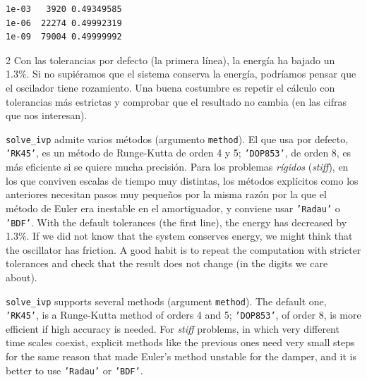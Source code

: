 \begin{verbatim}
1e-03   3920 0.49349585
1e-06  22274 0.49992319
1e-09  79004 0.49999992
\end{verbatim}
\begin{paracol}{2}
Con las tolerancias por defecto (la primera línea), la energía ha bajado un 1.3\%. Si no supiéramos que el sistema conserva la energía, podríamos pensar que el oscilador tiene rozamiento. Una buena costumbre es repetir el cálculo con tolerancias más estrictas y comprobar que el resultado no cambia (en las cifras que nos interesan).

\texttt{solve_ivp} admite varios métodos (argumento \texttt{method}). El que usa por defecto, \texttt{'RK45'}, es un método de Runge-Kutta de orden 4 y 5; \texttt{'DOP853'}, de orden 8, es más eficiente si se quiere mucha precisión. Para los problemas \emph{rígidos} (\emph{stiff}), en los que conviven escalas de tiempo muy distintas, los métodos explícitos como los anteriores necesitan pasos muy pequeños por la misma razón por la que el método de Euler era inestable en el amortiguador, y conviene usar \texttt{'Radau'} o \texttt{'BDF'}.
\switchcolumn
With the default tolerances (the first line), the energy has decreased by 1.3\%. If we did not know that the system conserves energy, we might think that the oscillator has friction. A good habit is to repeat the computation with stricter tolerances and check that the result does not change (in the digits we care about).

\texttt{solve_ivp} supports several methods (argument \texttt{method}). The default one, \texttt{'RK45'}, is a Runge-Kutta method of orders 4 and 5; \texttt{'DOP853'}, of order 8, is more efficient if high accuracy is needed. For \emph{stiff} problems, in which very different time scales coexist, explicit methods like the previous ones need very small steps for the same reason that made Euler's method unstable for the damper, and it is better to use \texttt{'Radau'} or \texttt{'BDF'}.
\end{paracol}

